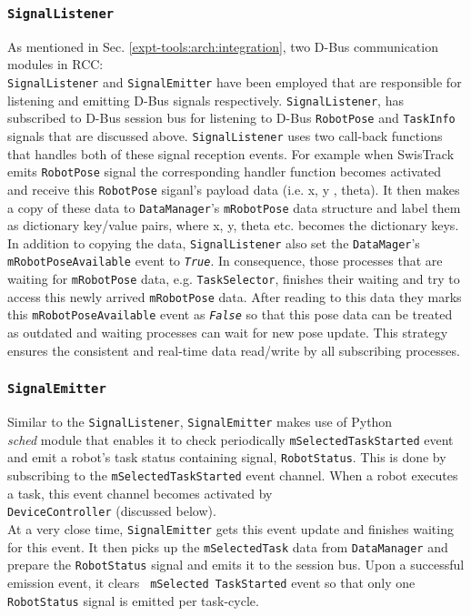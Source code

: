 \subsubsection*{\texttt{SignalListener}}
As mentioned in Sec. \ref{expt-tools:arch:integration}, two D-Bus communication modules in RCC:\\ \texttt{SignalListener} and \texttt{SignalEmitter} have been employed that are responsible for listening and emitting D-Bus signals respectively. \texttt{SignalListener}, has subscribed to D-Bus session bus for listening  to D-Bus \texttt{RobotPose} and \texttt{TaskInfo} signals that are discussed above. \texttt{SignalListener} uses two call-back functions that handles both of these signal reception events. For example when SwisTrack emits \texttt{RobotPose} signal  the corresponding handler function becomes activated and receive this \texttt{RobotPose} siganl's payload data (i.e. x, y , theta). It then makes a copy of these data  to \texttt{DataManager}'s \texttt{mRobotPose} data structure and label them as dictionary key/value pairs, where x, y, theta etc. becomes the dictionary keys. In addition to copying the data, \texttt{SignalListener} also set the \texttt{DataMager}'s   \texttt{mRobotPoseAvailable} event to {\em \texttt{True}}. In consequence, those processes that are waiting for \texttt{mRobotPose} data, e.g. \texttt{TaskSelector}, finishes their waiting and try to access this newly arrived \texttt{mRobotPose} data. After reading to this data they marks this \texttt{mRobotPoseAvailable} event as  {\em \texttt{False}} so that this pose data can be treated as outdated and waiting processes can wait for new pose update. This strategy ensures the consistent and real-time data read/write by all subscribing processes.
\subsubsection*{\texttt{SignalEmitter}}
Similar to the \texttt{SignalListener}, \texttt{SignalEmitter} makes use of Python\\ {\em sched} module that enables it to check periodically \texttt{mSelectedTaskStarted} event and emit a robot's task status containing signal, \texttt{RobotStatus}.  This is done by subscribing to the  \texttt{mSelectedTaskStarted} event channel. When a robot executes a task, this event channel becomes  activated by\\ \texttt{DeviceController} (discussed below).\\ At a very close time, \texttt{SignalEmitter} gets this event update and finishes waiting for this event. It then picks up the \texttt{mSelectedTask} data from \texttt{DataManager} and prepare the \texttt{RobotStatus} signal and emits it to the session bus. Upon a successful emission event, it clears \texttt{ mSelected TaskStarted} event so that only one \texttt{RobotStatus}  signal is emitted per task-cycle.
